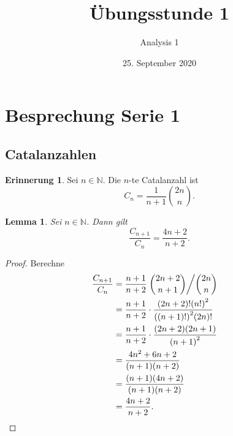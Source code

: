 \documentclass[12pt,a4paper]{article}
\title{Übungsstunde 1}
\author{Analysis 1}
\date{25. September 2020}
\newtheorem*{lemma}{Lemma}
\theoremstyle{definition}
\newtheorem*{reminder}{Erinnerung}
\begin{document}
\maketitle

\section{Besprechung Serie 1}
\subsection*{Catalanzahlen}
\begin{reminder}
  Sei $n \in \mathbb N$. Die $n$-te Catalanzahl ist
  \[C_{n} = \frac{1}{n+1}\binom{2n}{n}.\]
\end{reminder}

\begin{lemma}
  Sei $n \in \mathbb N$. Dann gilt
  \[\frac{C_{n+1}}{C_{n}} = \frac{4n+2}{n+2}.\]
\end{lemma}

\begin{proof}
  Berechne
  \begin{align*}
    \frac{C_{n+1}}{C_{n}}
    &= \frac{n+1}{n+2} \left. \binom{2n + 2}{n + 1} \middle/ \binom{2n}{n} \right. \\
    &= \frac{n+1}{n+2} \cdot \frac{(2n+2)!{(n!)}^{2}}{{((n+1)!)}^{2}(2n)!} \\
    &= \frac{n+1}{n+2} \cdot \frac{(2n+2)(2n+1)}{{(n+1)}^{2}} \\
    &= \frac{4n^{2} + 6n + 2}{(n+1)(n+2)} \\
    &= \frac{(n+1)(4n+2)}{(n+1)(n+2)} \\
    &= \frac{4n+2}{n+2}. & \qedhere
  \end{align*}
\end{proof}
\end{document}
